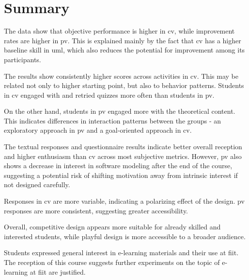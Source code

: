 \section{Summary}
\label{sec:exp-summary}


The data show that objective performance is higher in \ac{cv}, while improvement rates are higher in \ac{pv}. This is explained mainly by the fact that \ac{cv} has a higher baseline skill in \ac{uml}, which also reduces the potential for improvement among its participants. 

The results show consistently higher scores across activities in \ac{cv}. This may be related not only to higher starting point, but also to behavior patterns. Students in \ac{cv} engaged with and retried quizzes more often than students in \ac{pv}.

On the other hand, students in \ac{pv} engaged more with the theoretical content. This indicates differences in interaction patterns between the groups - an exploratory approach in \ac{pv} and a goal-oriented approach in \ac{cv}.

The textual responses and questionnaire results indicate better overall reception and higher enthusiasm than \ac{cv} across most subjective metrics. However, \ac{pv} also shows a decrease in interest in software modeling after the end of the course, suggesting a potential risk of shifting motivation away from intrinsic interest if not designed carefully.

Responses in \ac{cv} are more variable, indicating a polarizing effect of the design. \ac{pv} responses are more consistent, suggesting greater accessibility.

Overall, competitive design appears more suitable for already skilled and interested students, while playful design is more accessible to a broader audience.

Students expressed general interest in e-learning materials and their use at \ac{fiit}. The reception of this course suggests further experiments on the topic of e-learning at \ac{fiit} are justified.



